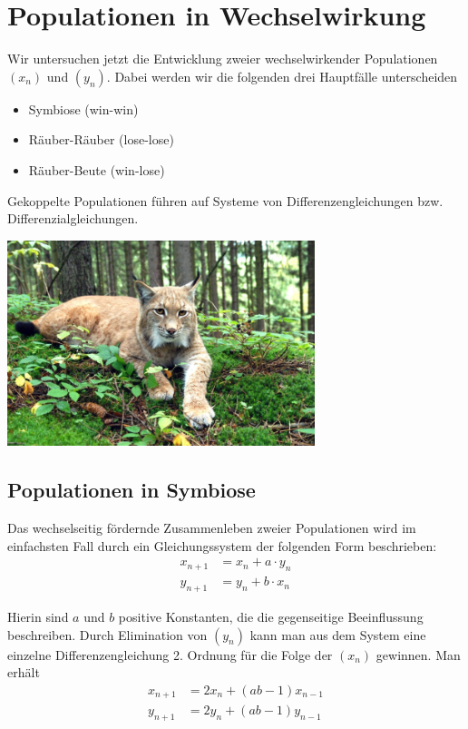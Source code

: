 \documentclass[%
11pt,%
twoside,%
titlepage,%
german,%
headsepline%
]{scrartcl}
\begin{document}
\clearpage

\section{Populationen in Wechselwirkung}
Wir
untersuchen jetzt die Entwicklung zweier wechselwirkender Populationen $(x_n)$ und $(y_n)$. Dabei werden wir die folgenden drei Hauptfälle unterscheiden

\begin{itemize}
\item Symbiose (win-win)
\item Räuber-Räuber (lose-lose)
\item Räuber-Beute (win-lose)
\end{itemize}

Gekoppelte Populationen führen auf Systeme von Differenzengleichungen bzw. Differenzialgleichungen.

\begin{center}
\includegraphics[height=6cm]{pictures/luchs.jpg}
\end{center}

\subsection{Populationen in Symbiose}
Das wechselseitig fördernde Zusammenleben zweier Populationen wird im einfachsten Fall durch ein Gleichungssystem der folgenden Form beschrieben:
\begin{align*}
x_{n+1} &= x_n+a\cdot y_n\\
y_{n+1} &= y_n+b\cdot x_n
\end{align*}

Hierin sind $a$ und $b$ positive Konstanten, die die gegenseitige Beeinflussung beschreiben. Durch Elimination von $(y_n)$ kann man aus dem System eine einzelne Differenzengleichung 2. Ordnung für die Folge der $(x_n)$ gewinnen. Man erhält
\begin{align*}
x_{n+1} &= 2x_n+(ab-1)x_{n-1}\\
y_{n+1} &= 2y_n+(ab-1)y_{n-1}
\end{align*}
\end{document}

